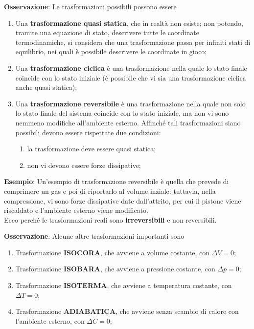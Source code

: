 \documentclass[a4paper]{extarticle}
\begin{document}
\newpage
\noindent
\textbf{Osservazione}: Le trasformazioni possibili possono essere
\begin{enumerate}
  \item Una \textbf{trasformazione quasi statica}, che in realtà non esiste; non potendo, tramite una equazione di stato, descrivere tutte le coordinate termodinamiche, si considera che una trasformazione passa per infiniti stati di equilibrio, nei quali è possibile descrivere le coordinate in gioco;
  \item Una \textbf{trasformazione ciclica} è una trasformazione nella quale lo stato finale coincide con lo stato iniziale (è possibile che vi sia una trasformazione ciclica anche quasi statica);
  \item Una \textbf{trasformazione reversibile} è una trasformazione nella quale non solo lo stato finale del sistema coincide con lo stato iniziale, ma non vi sono nemmeno modifiche all'ambiente esterno. Affinché tali trasformazioni siano possibili devono essere rispettate due condizioni:
  \begin{enumerate}
    \item la trasformazione deve essere quasi statica;
    \item non vi devono essere forze dissipative;
  \end{enumerate}
\end{enumerate}

\vspace{1em}
\noindent
\textbf{Esempio}: Un'esempio di trasformazione reversibile è quella che prevede di comprimere un gas e poi di riportarlo al volume inziale: tuttavia, nella compressione, vi sono forze dissipative date dall'attrito, per cui il pistone viene riscaldato e l'ambiente esterno viene modificato.\\
Ecco perché le trasformazioni reali sono \textbf{irreversibili} e non reversibili.

\vspace{1em}
\noindent
\textbf{Osservazione}: Alcune altre trasformazioni importanti sono
\begin{enumerate}
  \item Trasformazione \textbf{ISOCORA}, che avviene a volume costante, con $\Delta V=0$;
  \item Trasformazione \textbf{ISOBARA}, che avviene a pressione costante, con $\Delta p=0$;
  \item Trasformazione \textbf{ISOTERMA}, che avviene a temperatura costante, con $\Delta T=0$;
  \item Trasformazione \textbf{ADIABATICA}, che avviene senza scambio di calore con l'ambiente esterno, con $\Delta C=0$;
\end{enumerate}
\end{document}
